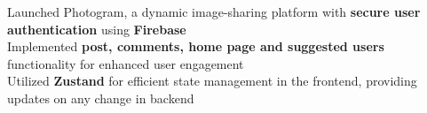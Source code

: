 \documentclass[]{Nikhil_Kadiyan_Resume}
\begin{document}
\pt Launched Photogram, a dynamic image-sharing platform with \textbf{secure user authentication} using \textbf{Firebase}\\
\pt Implemented \textbf{post, comments, home page and suggested users} functionality for enhanced user engagement \\
\pt Utilized \textbf{Zustand} for efficient state management in the frontend, providing updates on any change in backend\\
\sectionsep




\end{document}
